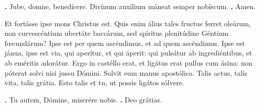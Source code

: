 \begin{small}
\textbf{\Vbar.} Jube, domne, benedícere.
Divínum auxílium máneat semper nobíscum. \textbf{\Rbar.} Amen.
\end{small}


Et fortásse ipse mons Christus est. Quis enim álius tales fructus ferret oleárum, non curvescéntium ubertáte baccárum, sed spíritus plenitúdine Géntium fœcundárum? Ipse est per quem ascéndimus, et ad quem ascéndimus. Ipse est jánua, ipse est via, qui aperítur, et qui áperit: qui pulsátur ab ingrediéntibus, et ab eméritis adorátur. Ergo in castéllo erat, et ligátus erat pullus cum ásina: non póterat solvi nisi jussu Dómini. Solvit eum manus apostólica. Talis actus, talis vita, talis grátia. Esto talis et tu, ut possis ligátos sólvere.

\textbf{\Vbar.} Tu autem, Dómine, miserére nobis.
\textbf{\Rbar.} Deo grátias.


